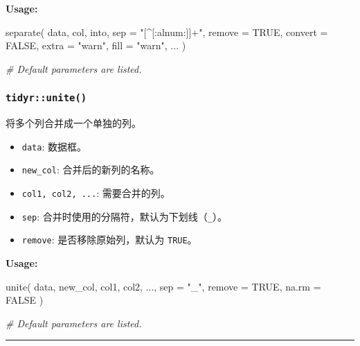 \documentclass[
]{article}
\newenvironment{Shaded}{}{}
\newcommand{\AttributeTok}[1]{\textcolor[rgb]{0.49,0.56,0.16}{#1}}
\newcommand{\CommentTok}[1]{\textcolor[rgb]{0.38,0.63,0.69}{\textit{#1}}}
\newcommand{\ConstantTok}[1]{\textcolor[rgb]{0.53,0.00,0.00}{#1}}
\newcommand{\FunctionTok}[1]{\textcolor[rgb]{0.02,0.16,0.49}{#1}}
\newcommand{\NormalTok}[1]{#1}
\newcommand{\StringTok}[1]{\textcolor[rgb]{0.25,0.44,0.63}{#1}}
\begin{document}
\textbf{Usage:}

\begin{Shaded}
\begin{Highlighting}[]
\FunctionTok{separate}\NormalTok{(}
\NormalTok{  data,}
\NormalTok{  col,}
\NormalTok{  into,}
  \AttributeTok{sep =} \StringTok{"[\^{}[:alnum:]]+"}\NormalTok{,}
  \AttributeTok{remove =} \ConstantTok{TRUE}\NormalTok{,}
  \AttributeTok{convert =} \ConstantTok{FALSE}\NormalTok{,}
  \AttributeTok{extra =} \StringTok{"warn"}\NormalTok{,}
  \AttributeTok{fill =} \StringTok{"warn"}\NormalTok{,}
\NormalTok{  ...}
\NormalTok{)}

\CommentTok{\# Default parameters are listed.}
\end{Highlighting}
\end{Shaded}

\hypertarget{tidyrunite}{%
\subsubsection{\texorpdfstring{\texttt{tidyr::unite()}}{tidyr::unite()}}\label{tidyrunite}}

将多个列合并成一个单独的列。

\begin{itemize}
\item
  \texttt{data}: 数据框。
\item
  \texttt{new\_col}: 合并后的新列的名称。
\item
  \texttt{col1,\ col2,\ ...}: 需要合并的列。
\item
  \texttt{sep}: 合并时使用的分隔符，默认为下划线（\texttt{\_}）。
\item
  \texttt{remove}: 是否移除原始列，默认为 \texttt{TRUE}。
\end{itemize}

\textbf{Usage:}

\begin{Shaded}
\begin{Highlighting}[]
\FunctionTok{unite}\NormalTok{(}
\NormalTok{  data,}
\NormalTok{  new\_col, }
\NormalTok{  col1, col2, ..., }
  \AttributeTok{sep =} \StringTok{"\_"}\NormalTok{, }
  \AttributeTok{remove =} \ConstantTok{TRUE}\NormalTok{, }
  \AttributeTok{na.rm =} \ConstantTok{FALSE}
\NormalTok{)}

\CommentTok{\# Default parameters are listed.}
\end{Highlighting}
\end{Shaded}

\begin{center}\rule{0.5\linewidth}{0.5pt}\end{center}
\end{document}
